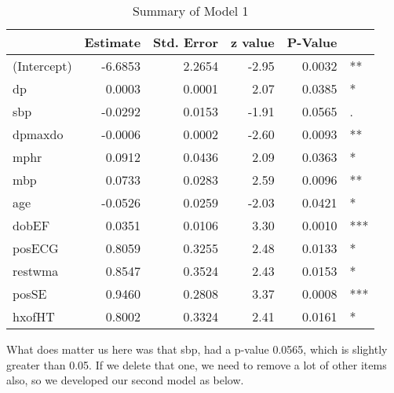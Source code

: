 \documentclass[a4paper,12pt]{article}
\begin{document}
   \begin{table}[htbp]
     \centering
     \caption{Summary of Model 1}
       \begin{tabular}{lrrrrl}
       \toprule[1.5pt]
             & Estimate & Std. Error & z value & P-Value &  \\
       \midrule
       (Intercept) & -6.6853 & 2.2654 & -2.95 & 0.0032 & ** \\
       dp    & 0.0003 & 0.0001 & 2.07  & 0.0385 & * \\
       sbp   & -0.0292 & 0.0153 & -1.91 & 0.0565 & . \\
       dpmaxdo & -0.0006 & 0.0002 & -2.60 & 0.0093 & ** \\
       mphr  & 0.0912 & 0.0436 & 2.09  & 0.0363 & * \\
       mbp   & 0.0733 & 0.0283 & 2.59  & 0.0096 & ** \\
       age   & -0.0526 & 0.0259 & -2.03 & 0.0421 & * \\
       dobEF & 0.0351 & 0.0106 & 3.30  & 0.0010 & *** \\
       posECG & 0.8059 & 0.3255 & 2.48  & 0.0133 & * \\
       restwma & 0.8547 & 0.3524 & 2.43  & 0.0153 & * \\
       posSE & 0.9460 & 0.2808 & 3.37  & 0.0008 & *** \\
       hxofHT & 0.8002 & 0.3324 & 2.41  & 0.0161 & * \\
       \bottomrule[1.5pt]
       \end{tabular}%
     \label{M1}%
   \end{table}%
 What does matter us here was that sbp, had a p-value 0.0565, which is slightly greater than 0.05. If we delete that one, we need to remove a lot of other items also, so we developed our second model as below.
\end{document}
